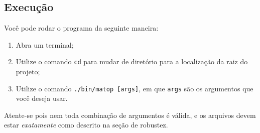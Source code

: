 \documentclass{article}
\def\code#1{\texttt{#1}}
\begin{document}
\subsection*{Execução}

Você pode rodar o programa da seguinte maneira:

\begin{enumerate}
    \item Abra um terminal;
    \item Utilize o comando \code{cd} para mudar de diretório para a localização da raiz do projeto;
    \item Utilize o comando \code{./bin/matop [args]}, em que \code{args} são os argumentos que você deseja usar. 
\end{enumerate}

Atente-se pois nem toda combinação de argumentos é válida, e os arquivos devem estar \textit{exatamente} como descrito na seção de robustez.
\end{document}

